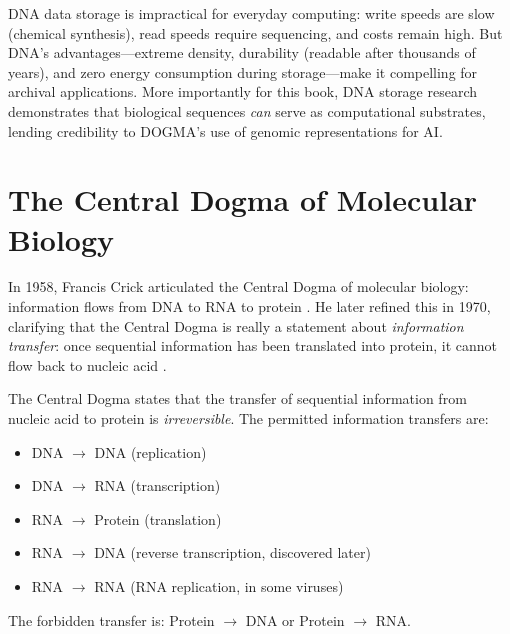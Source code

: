 \begin{bioinsight}
DNA data storage is impractical for everyday computing: write speeds are slow (chemical synthesis), read speeds require sequencing, and costs remain high. But DNA's advantages---extreme density, durability (readable after thousands of years), and zero energy consumption during storage---make it compelling for archival applications. More importantly for this book, DNA storage research demonstrates that biological sequences \emph{can} serve as computational substrates, lending credibility to DOGMA's use of genomic representations for AI.
\end{bioinsight}

\section{The Central Dogma of Molecular Biology}
\label{sec:central-dogma}

In 1958, Francis Crick articulated the Central Dogma of molecular biology: information flows from DNA to RNA to protein \citep{crick1958}. He later refined this in 1970, clarifying that the Central Dogma is really a statement about \emph{information transfer}: once sequential information has been translated into protein, it cannot flow back to nucleic acid \citep{crick1970}.

\begin{dogmadef}
The Central Dogma states that the transfer of sequential information from nucleic acid to protein is \emph{irreversible}. The permitted information transfers are:
\begin{itemize}[leftmargin=1.5em]
  \item DNA $\to$ DNA (replication)
  \item DNA $\to$ RNA (transcription)
  \item RNA $\to$ Protein (translation)
  \item RNA $\to$ DNA (reverse transcription, discovered later)
  \item RNA $\to$ RNA (RNA replication, in some viruses)
\end{itemize}
The forbidden transfer is: Protein $\to$ DNA or Protein $\to$ RNA.
\end{dogmadef}

